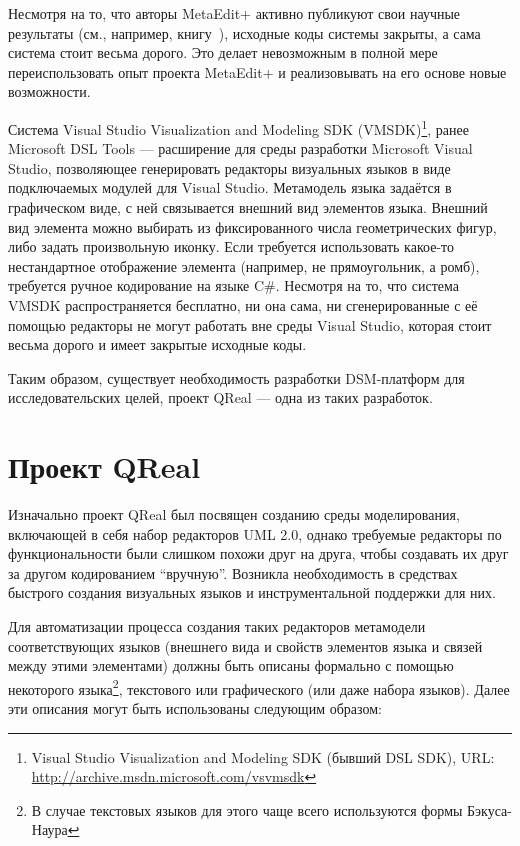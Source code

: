 \documentclass[a4]{article}
\begin{document}
Несмотря на то, что авторы MetaEdit+ активно публикуют свои научные результаты (см., например, книгу~\cite{dsmbook}), исходные коды системы закрыты, а сама система стоит весьма дорого. Это делает невозможным в полной мере переиспользовать опыт проекта MetaEdit+ и реализовывать на его основе новые возможности. 
	
Система Visual Studio Visualization and Modeling SDK (VMSDK)\footnote{Visual Studio Visualization and Modeling SDK (бывший DSL SDK), URL: \url{http://archive.msdn.microsoft.com/vsvmsdk}}, ранее Microsoft DSL Tools --- расширение для среды разработки Microsoft Visual Studio, позволяющее генерировать редакторы визуальных языков в виде подключаемых модулей для Visual Studio. Метамодель языка задаётся в графическом виде, с ней связывается внешний вид элементов языка. Внешний вид элемента можно выбирать из фиксированного числа геометрических фигур, либо задать произвольную иконку. Если требуется использовать какое-то нестандартное отображение элемента (например, не прямоугольник, а ромб), требуется ручное кодирование на языке C\#. Несмотря на то, что система VMSDK распространяется бесплатно, ни она сама, ни сгенерированные с её помощью редакторы не могут работать вне среды Visual Studio, которая стоит весьма дорого и имеет закрытые исходные коды.

Таким образом, существует необходимость разработки DSM-платформ для исследовательских целей, проект QReal --- одна из таких разработок.

\section{Проект QReal}

Изначально проект QReal был посвящен созданию среды моделирования, включающей в себя набор редакторов UML 2.0, однако требуемые редакторы по функциональности были слишком похожи друг на друга, чтобы создавать их друг за другом кодированием “вручную”. Возникла необходимость в средствах быстрого создания визуальных языков и инструментальной поддержки для них.

Для автоматизации процесса создания таких редакторов метамодели соответствующих языков (внешнего вида и свойств элементов языка и связей между этими элементами) должны быть описаны формально с помощью некоторого языка\footnote{В случае текстовых языков для этого чаще всего используются формы Бэкуса-Наура}, текстового или графического (или даже набора языков). Далее эти описания могут быть использованы следующим образом:
\end{document}
